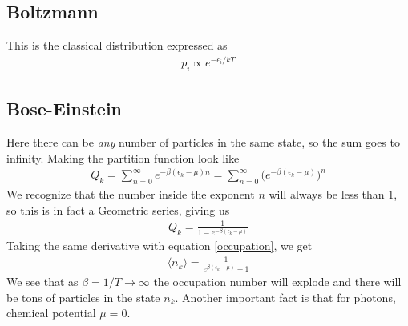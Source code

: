 \subsection{Boltzmann}
This is the classical distribution expressed as
\begin{align}
    p_i\propto e^{-\epsilon_i/kT}
\end{align}
\subsection{Bose-Einstein}
Here there can be \emph{any} number of particles in the same state, so the sum goes to infinity. Making the partition function look like
\begin{align}
    Q_k = \sum_{n=0}^\infty e^{-\beta(\epsilon_k - \mu)n} = \sum_{n=0}^\infty \Big(e^{-\beta(\epsilon_k - \mu)}\Big)^n
\end{align}
We recognize that the number inside the exponent $n$ will always be less than $1$, so this is in fact a Geometric series, giving us
\begin{align}
    Q_k = \frac{1}{1 - e^{-\beta(\epsilon_k - \mu)}}
\end{align}
Taking the same derivative with equation \ref{occupation}, we get
\begin{align}
\langle n_k\rangle = \frac{1}{e^{\beta(\epsilon_k-\mu)}-1}
\end{align}
We see that as $\beta = 1/T \rightarrow \infty$ the occupation number will explode and there will be tons of particles in the state $n_k$. Another important fact is that for photons, chemical potential $\mu = 0$. 


